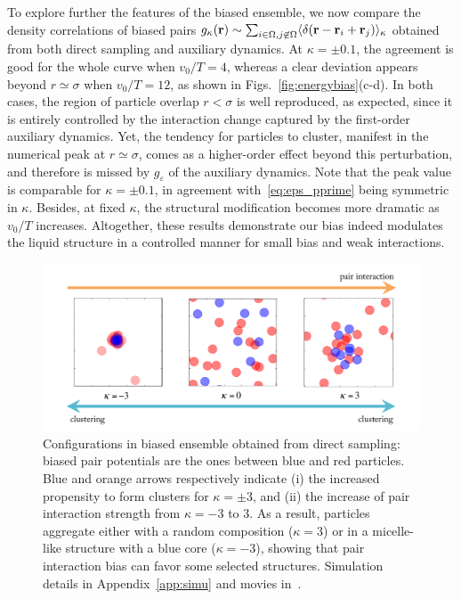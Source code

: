 \documentclass[pre, superscriptaddress, twocolumn,pre]{revtex4-1}
\begin{document}
To explore further the features of the biased ensemble, we now compare the density correlations of biased pairs $g_\kappa({\bf r})\sim \sum_{i\in\Omega,j\not\in\Omega}\langle \delta({\bf r}-{\bf r}_i+{\bf r}_j)\rangle_\kappa$ obtained from both direct sampling and auxiliary dynamics. At $\kappa=\pm0.1$, the agreement is good for the whole curve when $v_0/T=4$, whereas a clear deviation appears beyond $r\simeq\sigma$ when $v_0/T=12$, as shown in Figs.~\ref{fig:energybias}(c-d). In both cases, the region of particle overlap $r<\sigma$ is well reproduced, as expected, since it is entirely controlled by the interaction change captured by the first-order auxiliary dynamics. Yet, the tendency for particles to cluster, manifest in the numerical peak at $r\simeq\sigma$, comes as a higher-order effect beyond this perturbation, and therefore is missed by $g_\varepsilon$ of the auxiliary dynamics. Note that the peak value is comparable for $\kappa=\pm0.1$, in agreement with~\eqref{eq:eps_pprime} being symmetric in $\kappa$. Besides, at fixed $\kappa$, the structural modification becomes more dramatic as $v_0/T$ increases. Altogether, these results demonstrate our bias indeed modulates the liquid structure in a controlled manner for small bias and weak interactions.


\begin{figure}
	\centering
	\includegraphics[width=.9\linewidth]{fig4.pdf}
	\caption{\label{fig:outofperturbation}
	Configurations in biased ensemble obtained from direct sampling: biased pair potentials are the ones between blue and red particles. Blue and orange arrows respectively indicate (i) the increased propensity to form clusters for $\kappa=\pm3$, and (ii) the increase of pair interaction strength from $\kappa=-3$ to $3$. As a result, particles aggregate either with a random composition ($\kappa=3$) or in a micelle-like structure with a blue core ($\kappa=-3$), showing that pair interaction bias can favor some selected structures.
		Simulation details in Appendix~\ref{app:simu} and movies in~\cite{movie}.
	}
\end{figure}
\end{document}
